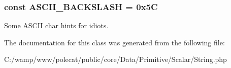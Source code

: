 \subsubsection[{A\+S\+C\+I\+I\+\_\+\+B\+A\+C\+K\+S\+L\+A\+S\+H}]{\setlength{\rightskip}{0pt plus 5cm}const A\+S\+C\+I\+I\+\_\+\+B\+A\+C\+K\+S\+L\+A\+S\+H = 0x5\+C}\label{class_able_polecat___data___primitive___scalar___string_a325270274e54b22cda0ff9e990b67bdf}
Some A\+S\+C\+I\+I char \textquotesingle{}hints\textquotesingle{} for idiots. 

The documentation for this class was generated from the following file\+:\begin{DoxyCompactItemize}
\item 
C\+:/wamp/www/polecat/public/core/\+Data/\+Primitive/\+Scalar/String.\+php\end{DoxyCompactItemize}
